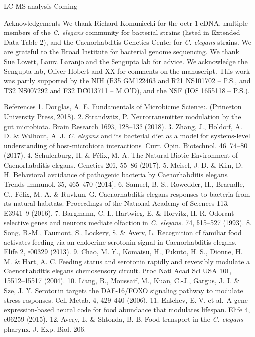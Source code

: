 \documentclass[]{article}
\begin{document}
LC-MS analysis Coming

Acknowledgements We thank Richard Komuniecki for the octr-1 cDNA,
multiple members of the \textit{C. elegans} community for bacterial
strains (listed in Extended Data Table 2), and the Caenorhabditis
Genetics Center for \textit{C. elegans} strains. We are grateful to the
Broad Institute for bacterial genome sequencing. We thank Sue Lovett,
Laura Laranjo and the Sengupta lab for advice. We acknowledge the
Sengupta lab, Oliver Hobert and XX for comments on the manuscript. This
work was partly supported by the NIH (R35 GM122463 and R21 NS101702 --
P.S., and T32 NS007292 and F32 DC013711 -- M.O'D), and the NSF (IOS
1655118 -- P.S.).

References 1. Douglas, A. E. Fundamentals of Microbiome Science:.
(Princeton University Press, 2018). 2. Strandwitz, P. Neurotransmitter
modulation by the gut microbiota. Brain Research 1693, 128--133 (2018).
3. Zhang, J., Holdorf, A. D. \& Walhout, A. J. \textit{C. elegans} and
its bacterial diet as a model for systems-level understanding of
host-microbiota interactions. Curr. Opin. Biotechnol. 46, 74--80 (2017).
4. Schulenburg, H. \& Félix, M.-A. The Natural Biotic Environment of
Caenorhabditis elegans. Genetics 206, 55--86 (2017). 5. Meisel, J. D. \&
Kim, D. H. Behavioral avoidance of pathogenic bacteria by Caenorhabditis
elegans. Trends Immunol. 35, 465--470 (2014). 6. Samuel, B. S.,
Rowedder, H., Braendle, C., Félix, M.-A. \& Ruvkun, G. Caenorhabditis
elegans responses to bacteria from its natural habitats. Proceedings of
the National Academy of Sciences 113, E3941--9 (2016). 7. Bargmann, C.
I., Hartwieg, E. \& Horvitz, H. R. Odorant-selective genes and neurons
mediate olfaction in \textit{C. elegans}. 74, 515--527 (1993). 8. Song,
B.-M., Faumont, S., Lockery, S. \& Avery, L. Recognition of familiar
food activates feeding via an endocrine serotonin signal in
Caenorhabditis elegans. Elife 2, e00329 (2013). 9. Chao, M. Y., Komatsu,
H., Fukuto, H. S., Dionne, H. M. \& Hart, A. C. Feeding status and
serotonin rapidly and reversibly modulate a Caenorhabditis elegans
chemosensory circuit. Proc Natl Acad Sci USA 101, 15512--15517 (2004).
10. Liang, B., Moussaif, M., Kuan, C.-J., Gargus, J. J. \& Sze, J. Y.
Serotonin targets the DAF-16/FOXO signaling pathway to modulate stress
responses. Cell Metab. 4, 429--440 (2006). 11. Entchev, E. V. et al.~A
gene-expression-based neural code for food abundance that modulates
lifespan. Elife 4, e06259 (2015). 12. Avery, L. \& Shtonda, B. B. Food
transport in the \textit{C. elegans} pharynx. J. Exp. Biol. 206,
\end{document}
